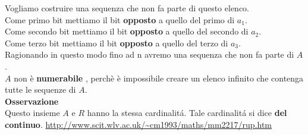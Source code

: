 \documentclass[11pt]{article}
\begin{document}
            Vogliamo costruire una sequenza che non fa parte di questo elenco. \\
            Come primo bit mettiamo il bit \textbf{opposto} a quello del primo di $a_{1}$.\\
            Come secondo bit mettiamo il bit \textbf{opposto} a quello del secondo di $a_{2}$.\\
            Come terzo bit mettiamo il bit \textbf{opposto} a quello del terzo di $a_{3}$.\\
            Ragionando in questo modo fino ad n avremo una sequenza che non fa parte di $A$.
            \\$A$ non \`e \textbf{numerabile} , perch\`e \`e impossibile creare un elenco infinito che contenga tutte le sequenze di $A$.\\
            \textbf{Osservazione}\\ 
            Questo insieme $A$ e $R$ hanno la stessa cardinalit\'a. Tale cardinalit\'a si dice \textbf{del continuo}. \url{http://www.scit.wlv.ac.uk/~cm1993/maths/mm2217/rup.htm}
\end{document}
